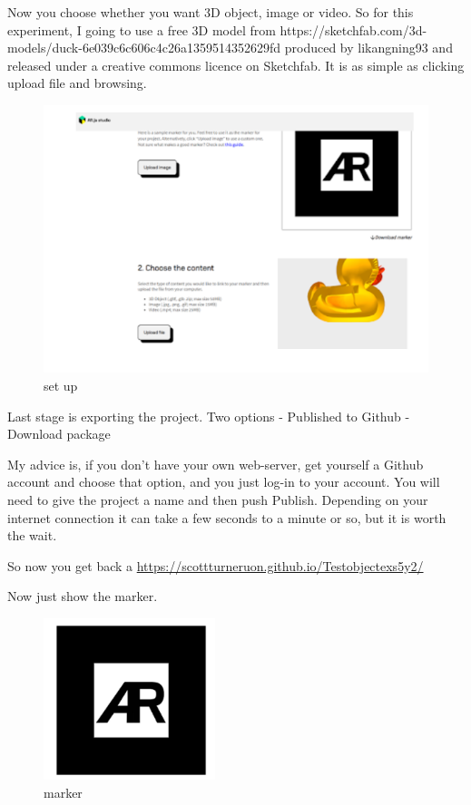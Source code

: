 Now you choose whether you want 3D object, image or video. So for this experiment, I going to use a free 3D model from https://sketchfab.com/3d-models/duck-6e039c6c606c4c26a1359514352629fd produced by likangning93 and released under a creative commons licence on Sketchfab. It is as simple as clicking upload file and browsing.

\begin{figure}
    \centering
    \includegraphics{chapters/ChapterAR/webar5.png}
    \caption{set up}
    \label{fig:my_setup}
\end{figure}

Last stage is exporting the project. Two options 
- Published to Github 
- Download package

My advice is, if you don't have your own web-server, get yourself a Github account and choose that option, and you just log-in to your account. You will need to give the project a name and then push Publish. Depending on your internet connection it can take a few seconds to a minute or so, but it is worth the wait.

So now you get back a \url{https://scottturneruon.github.io/Testobjectexs5y2/} 

Now just show the marker.
\begin{figure}
    \centering
    \includegraphics[width=5cm]{chapters/ChapterAR/webar6.png}
    \caption{marker}
    \label{fig:marker}
\end{figure}

